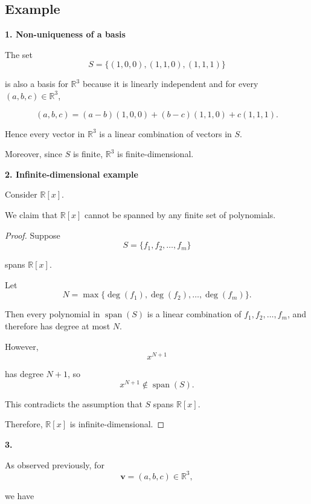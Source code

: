 \documentclass[12pt]{article}
\begin{document}
\subsection{Example}

\textbf{1. Non-uniqueness of a basis}

\bigskip

The set
\[
S=\{(1,0,0),(1,1,0),(1,1,1)\}
\]

is also a basis for $\mathbb{R}^3$ because it is linearly independent and for every
$(a,b,c)\in\mathbb{R}^3$,

\[
(a,b,c)
=
(a-b)(1,0,0)
+
(b-c)(1,1,0)
+
c(1,1,1).
\]

Hence every vector in $\mathbb{R}^3$ is a linear combination of vectors in $S$.

Moreover, since $S$ is finite, $\mathbb{R}^3$ is finite-dimensional.

\bigskip

\textbf{2. Infinite-dimensional example}

\bigskip

Consider $\mathbb{R}[x]$.

We claim that $\mathbb{R}[x]$ cannot be spanned by any finite set of polynomials.

\begin{proof}
Suppose
\[
S=\{f_1,f_2,\ldots,f_m\}
\]

spans $\mathbb{R}[x]$.

Let
\[
N=\max\{\deg(f_1),\deg(f_2),\ldots,\deg(f_m)\}.
\]

Then every polynomial in $\operatorname{span}(S)$ is a linear combination of
$f_1,f_2,\ldots,f_m$, and therefore has degree at most $N$.

However,
\[
x^{N+1}
\]

has degree $N+1$, so
\[
x^{N+1}\notin \operatorname{span}(S).
\]

This contradicts the assumption that $S$ spans $\mathbb{R}[x]$.

\bigskip

Therefore, $\mathbb{R}[x]$ is infinite-dimensional.
\end{proof}

\bigskip

\textbf{3.}

\bigskip

As observed previously, for
\[
\mathbf{v}=(a,b,c)\in\mathbb{R}^3,
\]

we have
\end{document}
